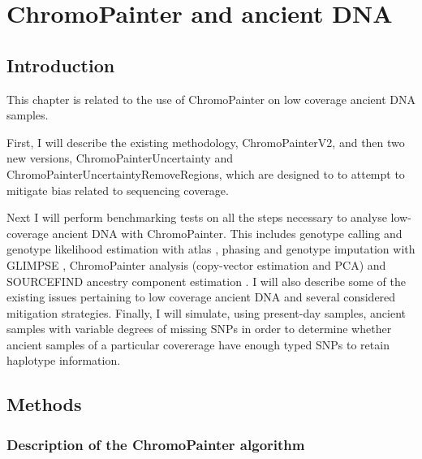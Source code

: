 \chapter{ChromoPainter and ancient DNA}
\label{chapterlabel2}

\section{Introduction}

This chapter is related to the use of ChromoPainter on low coverage ancient DNA samples. 

First, I will describe the existing methodology, ChromoPainterV2, and then two new versions, ChromoPainterUncertainty and ChromoPainterUncertaintyRemoveRegions, which are designed to to attempt to mitigate bias related to sequencing coverage. 

Next I will perform benchmarking tests on all the steps necessary to analyse low-coverage ancient DNA with ChromoPainter. This includes genotype calling and genotype likelihood estimation with atlas \cite{Link2017}, phasing and genotype imputation with GLIMPSE \cite{rubinacci2021efficient}, ChromoPainter \cite{Lawson2012} analysis (copy-vector estimation and PCA) and SOURCEFIND ancestry component estimation \cite{Chacon-Duque2018}. I will also describe some of the existing issues pertaining to low coverage ancient DNA and several considered mitigation strategies. Finally, I will simulate, using present-day samples, ancient samples with variable degrees of missing SNPs in order to determine whether ancient samples of a particular covererage have enough typed SNPs to retain haplotype information.   

\section{Methods}

\subsection{Description of the ChromoPainter algorithm}

